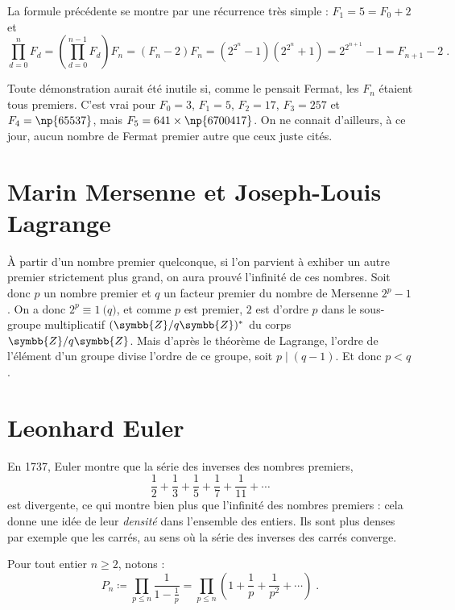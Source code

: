 \documentclass[a4paper,11pt]{article}
\newcommand{\Z}{\ensuremath{\symbb{Z}}\xspace}
\begin{document}
\smallskip
La formule précédente se montre par une récurrence très simple :
$F_1=5=F_0+2$ et
\[
  \prod_{d=0}^n F_d = \left(\prod_{d=0}^{n-1}F_d\right) F_n
  = (F_n-2)F_n = (2^{2^n}-1)(2^{2^n}+1) = 2^{2^{n+1}}-1 = F_{n+1}-2 \;.
\]

Toute démonstration aurait été inutile si, comme le pensait Fermat, les
$F_n$ étaient tous premiers. C'est vrai pour $F_0=3$, $F_1=5$, $F_2=17$,
$F_3=257$ et $F_4=\np{65 537}$, mais $F_5=641\times \np{6 700 417}$.
On ne connait d'ailleurs, à ce jour, aucun nombre de Fermat premier
autre que ceux juste cités.

\section{Marin Mersenne et Joseph-Louis Lagrange}

À partir d'un nombre premier quelconque, si l'on parvient à exhiber un
autre premier strictement plus grand, on aura prouvé l'infinité de ces
nombres. Soit donc $p$ un nombre premier et $q$ un facteur premier du nombre
de Mersenne $2^p-1$. On a donc $2^p\equiv 1\pod{q}$, et comme $p$ est
premier, $2$ est d'ordre $p$ dans le sous-groupe multiplicatif $(\Z/q\Z)^*$
du corps $\Z/q\Z$. Mais d'après le théorème de Lagrange, l'ordre de
l'élément d'un groupe divise l'ordre de ce groupe, soit $p\mid (q-1)$. Et
donc $p<q$.

\section{Leonhard Euler}

En 1737, Euler montre que la série des inverses des nombres premiers,
\[
  \frac{1}{2}+\frac{1}{3}+\frac{1}{5}+\frac{1}{7}+\frac{1}{11}+\cdots
\]
est divergente, ce qui montre bien plus que l'infinité des nombres premiers :
cela donne une idée de leur \emph{densité} dans l'ensemble des entiers.
Ils sont plus denses par exemple que les carrés, au sens où la série des
inverses des carrés converge.

Pour tout entier $n\ge 2$, notons :
\[
  P_n \coloneq \prod_{p\le n}\frac{1}{1-\frac{1}{p}}
  = \prod_{p\le n}\left(1+\frac{1}{p}+\frac{1}{p^2}+\cdots\right) \;.
\]
\end{document}

